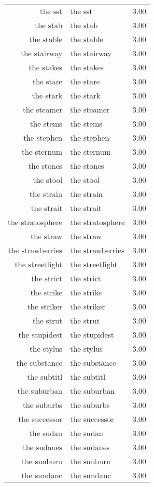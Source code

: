 \begin{table}[ht]
\begin{tabular}{rlr}
  the sst & the sst & 3.00 \\ 
  the stab & the stab & 3.00 \\ 
  the stable & the stable & 3.00 \\ 
  the stairway & the stairway & 3.00 \\ 
  the stakes & the stakes & 3.00 \\ 
  the stare & the stare & 3.00 \\ 
  the stark & the stark & 3.00 \\ 
  the steamer & the steamer & 3.00 \\ 
  the stems & the stems & 3.00 \\ 
  the stephen & the stephen & 3.00 \\ 
  the sternum & the sternum & 3.00 \\ 
  the stones & the stones & 3.00 \\ 
  the stool & the stool & 3.00 \\ 
  the strain & the strain & 3.00 \\ 
  the strait & the strait & 3.00 \\ 
  the stratosphere & the stratosphere & 3.00 \\ 
  the straw & the straw & 3.00 \\ 
  the strawberries & the strawberries & 3.00 \\ 
  the streetlight & the streetlight & 3.00 \\ 
  the strict & the strict & 3.00 \\ 
  the strike & the strike & 3.00 \\ 
  the striker & the striker & 3.00 \\ 
  the strut & the strut & 3.00 \\ 
  the stupidest & the stupidest & 3.00 \\ 
  the stylus & the stylus & 3.00 \\ 
  the substance & the substance & 3.00 \\ 
  the subtitl & the subtitl & 3.00 \\ 
  the suburban & the suburban & 3.00 \\ 
  the suburbs & the suburbs & 3.00 \\ 
  the successor & the successor & 3.00 \\ 
  the sudan & the sudan & 3.00 \\ 
  the sudanes & the sudanes & 3.00 \\ 
  the sunburn & the sunburn & 3.00 \\ 
  the sundanc & the sundanc & 3.00 \\ 

\end{tabular}
\end{table}
